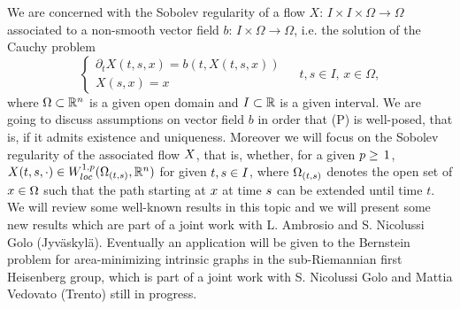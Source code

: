 \mypage
{}
\begin{myabstract}
We are concerned with the Sobolev regularity of a flow 
$X:\,I\times I\times \Omega\to\Omega$ 
associated to a non-smooth vector field 
$b:\,I\times\Omega\to\Omega$, 
i.e. the solution of the Cauchy problem
\[
\begin{cases}
\partial_tX(t,s,x)=b(t,X(t,s,x))\\
X(s,x)=x
\end{cases}
\quad\,t,s\in I, \,x\in\Omega,
\tag{P}
\]
where $\Omega\subset\mathbb R^n\protect $ is a given open domain and $I\subset\mathbb R\protect $ is a  given  interval.
We are going  to discuss   assumptions on vector field 
$b$ in order that (P) is well-posed, that is, if it admits existence and uniqueness. Moreover we will focus  on the Sobolev regularity of the associated flow $X\protect $,    that is,  whether, for a given $p\ge\,1\protect $,   $X(t,s,\cdot)\in W_{loc}^{1,p}(\Omega_{(t,s)},\mathbb R^n)\protect $ for given $t,s\in I\protect $, where $\Omega_{(t,s)}\protect $ denotes the open set of $x\in\Omega\protect $ such that the path starting at $x\protect $ at time $s\protect $ can be extended until time $t$.  We will review some well-known results  in this topic and we will present some new results which  are part of a joint work with L. Ambrosio  and S. Nicolussi Golo (Jyväskylä). Eventually an application will be given to the Bernstein problem for area-minimizing intrinsic graphs in the sub-Riemannian first Heisenberg group, which is part of a joint work with S. Nicolussi Golo and Mattia Vedovato (Trento) still in progress.
\end{myabstract}

